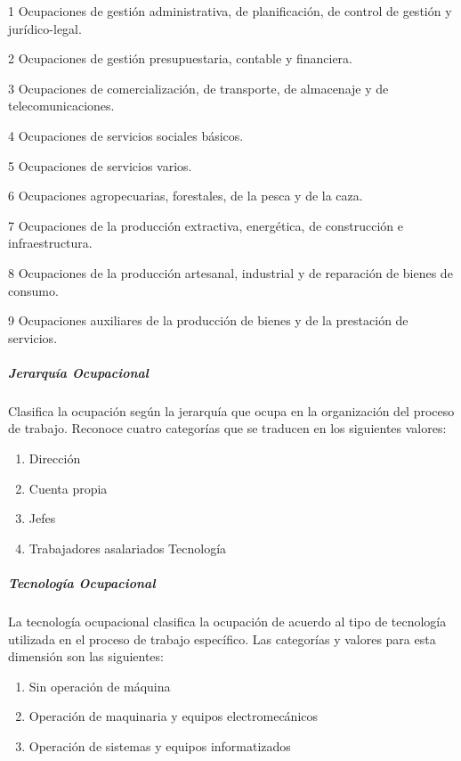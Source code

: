 \documentclass[
]{article}
\providecommand{\tightlist}{%
  \setlength{\itemsep}{0pt}\setlength{\parskip}{0pt}}
\begin{document}
1 Ocupaciones de gestión administrativa, de planificación, de control de gestión y jurídico-legal.

2 Ocupaciones de gestión presupuestaria, contable y financiera.

3 Ocupaciones de comercialización, de transporte, de almacenaje y de telecomunicaciones.

4 Ocupaciones de servicios sociales básicos.

5 Ocupaciones de servicios varios.

6 Ocupaciones agropecuarias, forestales, de la pesca y de la caza.

7 Ocupaciones de la producción extractiva, energética, de construcción e infraestructura.

8 Ocupaciones de la producción artesanal, industrial y de reparación de bienes de consumo.

9 Ocupaciones auxiliares de la producción de bienes y de la prestación de servicios.

\hypertarget{jerarquuxeda-ocupacional}{%
\subparagraph{Jerarquía Ocupacional}\label{jerarquuxeda-ocupacional}}

Clasifica la ocupación según la jerarquía que ocupa en la organización del proceso de trabajo. Reconoce cuatro categorías que se traducen en los siguientes valores:

\begin{enumerate}
\def\labelenumi{\arabic{enumi}.}
\setcounter{enumi}{-1}
\tightlist
\item
  Dirección\\
\item
  Cuenta propia\\
\item
  Jefes\\
\item
  Trabajadores asalariados Tecnología
\end{enumerate}

\hypertarget{tecnologuxeda-ocupacional}{%
\subparagraph{Tecnología Ocupacional}\label{tecnologuxeda-ocupacional}}

La tecnología ocupacional clasifica la ocupación de acuerdo al tipo de tecnología utilizada en el proceso de trabajo específico. Las categorías y valores para esta dimensión son las siguientes:

\begin{enumerate}
\def\labelenumi{\arabic{enumi}.}
\tightlist
\item
  Sin operación de máquina\\
\item
  Operación de maquinaria y equipos electromecánicos\\
\item
  Operación de sistemas y equipos informatizados
\end{enumerate}
\end{document}
